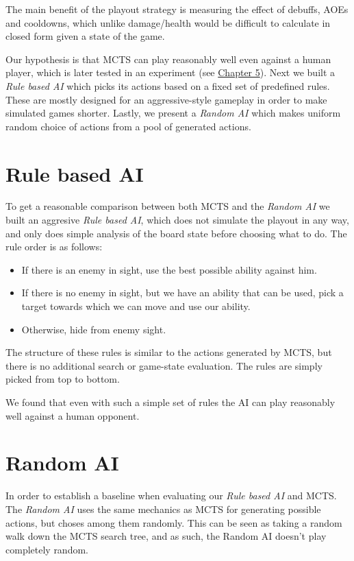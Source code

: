 The main benefit of the playout strategy is measuring the effect of debuffs, AOEs and cooldowns,
which unlike damage/health would be difficult to calculate in closed form given a state of the game.

Our hypothesis is that MCTS can play reasonably well even against a human
player, which is later tested in an experiment (see
\hyperref[chapter05]{Chapter 5}).  Next we built a \emph{Rule based AI} which
picks its actions based on a fixed set of predefined rules. These are mostly
designed for an aggressive-style gameplay in order to make simulated games
shorter. Lastly, we present a \emph{Random AI} which makes uniform random
choice of actions from a pool of generated actions.

\section{Rule based AI}

To get a reasonable comparison between both MCTS and the \emph{Random AI} we
built an aggresive \emph{Rule based AI}, which does not simulate the playout in
any way, and only does simple analysis of the board state before choosing what
to do. The rule order is as follows:

\begin{itemize}
\item If there is an enemy in sight, use the best possible ability against him.
\item If there is no enemy in sight, but we have an ability that can be used, pick a target towards which we can move and use our ability.
\item Otherwise, hide from enemy sight.
\end{itemize}

The structure of these rules is similar to the actions generated by MCTS,
but there is no additional search or game-state evaluation. The rules are
simply picked from top to bottom.

We found that even with such a simple set of rules the AI can play reasonably
well against a human opponent.

\section{Random AI}

In order to establish a baseline when evaluating our \emph{Rule based AI} and MCTS\@.
The \emph{Random AI} uses the same mechanics as MCTS for generating possible actions,
but choses among them randomly. This can be seen as taking a random walk down
the MCTS search tree, and as such, the Random AI doesn't play completely random.

